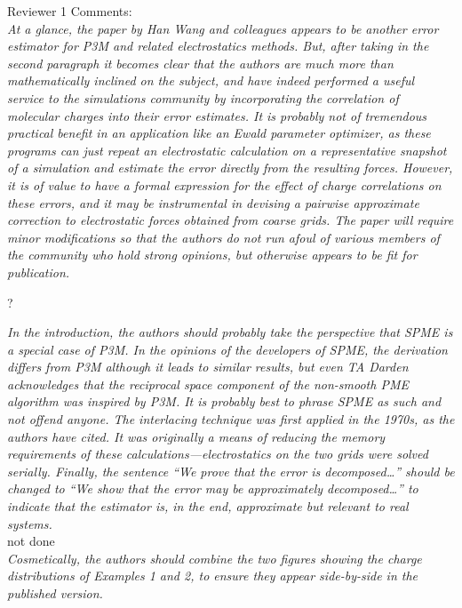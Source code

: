 \documentclass[a4paper]{article}
\begin{document}
\noindent
Reviewer  1 Comments:\\

\textit{ At a glance, the paper by Han Wang and colleagues appears to
  be another error estimator for P3M and related electrostatics
  methods.  But, after taking in the second paragraph it becomes clear
  that the authors are much more than mathematically inclined on the
  subject, and have indeed performed a useful service to the
  simulations community by incorporating the correlation of molecular
  charges into their error estimates.  It is probably not of
  tremendous practical benefit in an application like an Ewald
  parameter optimizer, as these programs can just repeat an
  electrostatic calculation on a representative snapshot of a
  simulation and estimate the error directly from the resulting
  forces.  However, it is of value to have a formal expression for the
  effect of charge correlations on these errors, and it may be
  instrumental in devising a pairwise approximate correction to
  electrostatic forces obtained from coarse grids.  The paper will
  require minor modifications so that the authors do not run afoul of
  various members of the community who hold strong opinions, but
  otherwise appears to be fit for publication.
}

?

\textit{
In the introduction, the authors should probably take the perspective that SPME is a special case of P3M.  In the opinions of the developers of SPME, the derivation differs from P3M although it leads to similar results, but even TA Darden acknowledges that the reciprocal space component of the non-smooth PME algorithm was inspired by P3M.  It is probably best to phrase SPME as such and not offend anyone.  The interlacing technique was first applied in the 1970s, as the authors have cited.  It was originally a means of reducing the memory requirements of these calculations—electrostatics on the two grids were solved serially.  Finally, the sentence “We prove that the error is decomposed…” should be changed to “We show that the error may be approximately decomposed…” to indicate that the estimator is, in the end, approximate but relevant to real systems.
}\\

not done\\

\textit{
Cosmetically, the authors should combine the two figures showing the charge distributions of Examples 1 and 2, to ensure they appear side-by-side in the published version.
}\\
\end{document}
